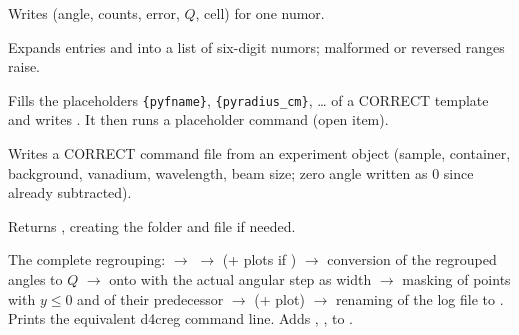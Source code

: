 \documentclass[11pt,a4paper]{article}
\begin{document}
Writes  (angle, counts, error, $Q$, cell) for one numor.

Expands entries  and  into a list of
six-digit numors; malformed or reversed ranges raise.

Fills the placeholders \texttt{\{pyfname\}}, \texttt{\{pyradius\_cm\}}, \ldots{} of a
CORRECT template and writes . It then runs a placeholder
command (open item). \legacy

Writes a CORRECT command file  from an experiment
object (sample, container, background, vanadium, wavelength, beam size;
zero angle written as 0 since already subtracted). \legacy

Returns , creating the folder and file if needed.


 
The complete regrouping:  $\to$  $\to$
 (+ plots if ) $\to$ conversion of the
regrouped angles to $Q$ $\to$  onto  with the
actual angular step as width $\to$ masking of points with $y\le0$ and of
their predecessor $\to$  (+ plot) $\to$ renaming of the log
file to . Prints the equivalent d4creg
command line. Adds , ,  to
.


\end{document}
